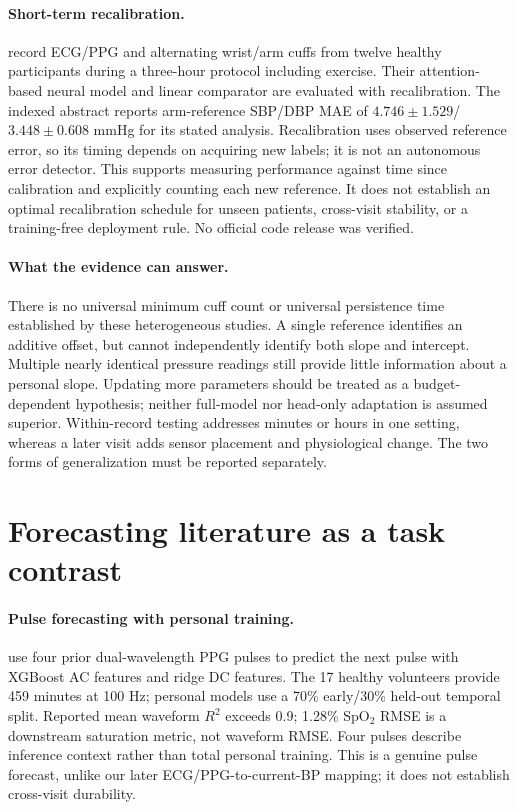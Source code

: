 \documentclass[11pt]{article}
\begin{document}
\paragraph{Short-term recalibration.}
\citet{seo2023} record ECG/PPG and alternating wrist/arm cuffs from twelve healthy participants during a three-hour protocol including exercise. Their attention-based neural model and linear comparator are evaluated with recalibration. The indexed abstract reports arm-reference SBP/DBP MAE of $4.746\pm1.529$/$3.448\pm0.608$ mmHg for its stated analysis. Recalibration uses observed reference error, so its timing depends on acquiring new labels; it is not an autonomous error detector. This supports measuring performance against time since calibration and explicitly counting each new reference. It does not establish an optimal recalibration schedule for unseen patients, cross-visit stability, or a training-free deployment rule. No official code release was verified.

\paragraph{What the evidence can answer.}
There is no universal minimum cuff count or universal persistence time established by these heterogeneous studies. A single reference identifies an additive offset, but cannot independently identify both slope and intercept. Multiple nearly identical pressure readings still provide little information about a personal slope. Updating more parameters should be treated as a budget-dependent hypothesis; neither full-model nor head-only adaptation is assumed superior. Within-record testing addresses minutes or hours in one setting, whereas a later visit adds sensor placement and physiological change. The two forms of generalization must be reported separately.

\section{Forecasting literature as a task contrast}
\paragraph{Pulse forecasting with personal training.}
\citet{badiola2025} use four prior dual-wavelength PPG pulses to predict the next pulse with XGBoost AC features and ridge DC features. The 17 healthy volunteers provide 459 minutes at 100 Hz; personal models use a 70\% early/30\% held-out temporal split. Reported mean waveform $R^2$ exceeds 0.9; 1.28\% SpO$_2$ RMSE is a downstream saturation metric, not waveform RMSE. Four pulses describe inference context rather than total personal training. This is a genuine pulse forecast, unlike our later ECG/PPG-to-current-BP mapping; it does not establish cross-visit durability.
\end{document}
